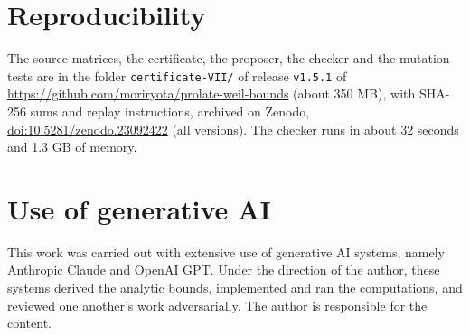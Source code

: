 \documentclass[11pt]{amsart}
\newcommand{\doi}[1]{\href{https://doi.org/#1}{doi:#1}}
\theoremstyle{remark}
\numberwithin{equation}{section}
\begin{document}
\section*{Reproducibility}
The source matrices, the certificate, the proposer, the checker and the mutation tests are in the folder \texttt{certificate-VII/} of release \texttt{v1.5.1} of \url{https://github.com/moriryota/prolate-weil-bounds} (about 350 MB), with SHA-256 sums and replay instructions, archived on Zenodo, \doi{10.5281/zenodo.23092422} (all versions). The checker runs in about 32 seconds and 1.3 GB of memory.

\section*{Use of generative AI}
This work was carried out with extensive use of generative AI systems, namely Anthropic Claude and OpenAI GPT. Under the direction of the author, these systems derived the analytic bounds, implemented and ran the computations, and reviewed one another's work adversarially. The author is responsible for the content.
\end{document}
